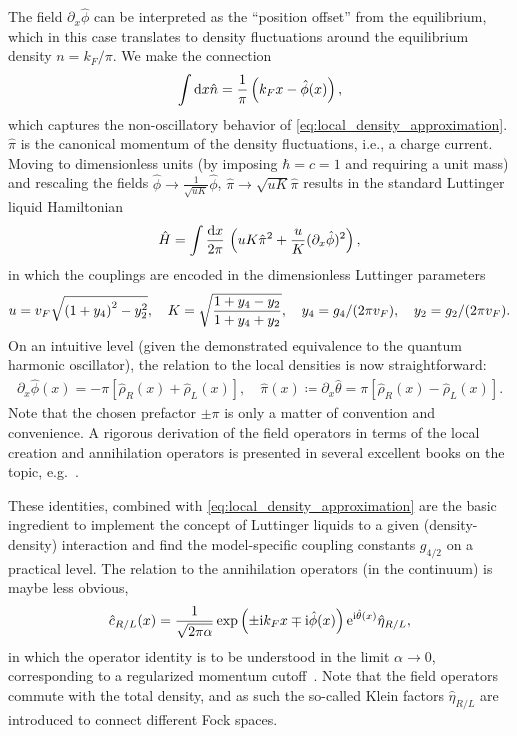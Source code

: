 The field $\partial_x\hat\phi$ can be interpreted as the ``position offset'' from the equilibrium, which in this case translates to density fluctuations around the equilibrium density $n=k_F/\pi$.
We make the connection
\begin{align}
    \int\mathrm d x\hat n = \frac1\pi\left( k_Fx - \hat\phi(x) \right),
\end{align}
which captures the non-oscillatory behavior of \cref{eq:local_density_approximation}.
$\hat\pi$ is the canonical momentum of the density fluctuations, i.e., a charge current.
Moving to dimensionless units (by imposing $\hbar=c=1$ and requiring a unit mass) and rescaling the fields $\hat\phi\rightarrow \frac1{\sqrt{uK}}\hat\phi$, $\hat\pi\rightarrow \sqrt{uK}\hat\pi$ results in the standard Luttinger liquid Hamiltonian
\begin{align}
    \hat H = \int\frac{\mathrm d x}{2\pi}\, \left( uK\hat\pi^2 + \frac uK(\partial_x\hat\phi)^2 \right),
    \label{eq:ll_hamiltonian}
\end{align}
in which the couplings are encoded in the dimensionless Luttinger parameters
\begin{align}
    u = v_F\sqrt{\left( 1 + y_4 \right)^2 - y_2^2},
    \quad
    K = \sqrt{\frac{1+y_4-y_2}{1+y_4+y_2}},
    \quad
    y_4=g_4/(2\pi v_F),
    \quad
    y_2=g_2/(2\pi v_F).
\end{align}
On an intuitive level (given the demonstrated equivalence to the quantum harmonic oscillator), the relation to the local densities is now straightforward:
\begin{align}
    \partial_x\hat\phi(x)=-\pi[\hat\rho_R(x)+\hat\rho_L(x)],
    \quad
    \hat\pi(x)\coloneqq\partial_x\hat\theta=\pi[\hat\rho_R(x)-\hat\rho_L(x)].
\end{align}
Note that the chosen prefactor $\pm\pi$ is only a matter of convention and convenience.
A rigorous derivation of the field operators in terms of the local creation and annihilation operators is presented in several excellent books on the topic, e.g.~\cite{Bruus2004,Giamarchi2003,Gogolin2004}.

These identities, combined with \cref{eq:local_density_approximation} are the basic ingredient to implement the concept of Luttinger liquids to a given (density-density) interaction and find the model-specific coupling constants $g_{4/2}$ on a practical level.
The relation to the annihilation operators (in the continuum) is maybe less obvious,
\begin{align}
    \hat c_{R/L}(x) = \frac1{\sqrt{2\pi\alpha}}\exp\left( \pm\mathrm i k_F x\mp\mathrm i\hat \phi(x) \right)\mathrm e^{\mathrm i\hat\theta(x)}\hat \eta_{R/L},
    \label{eq:bosonization_identity}
\end{align}
in which the operator identity is to be understood in the limit $\alpha\rightarrow0$, corresponding to a regularized momentum cutoff~\cite{Bruus2004}.
Note that the field operators commute with the total density, and as such the so-called Klein factors $\hat\eta_{R/L}$ are introduced to connect different Fock spaces.

